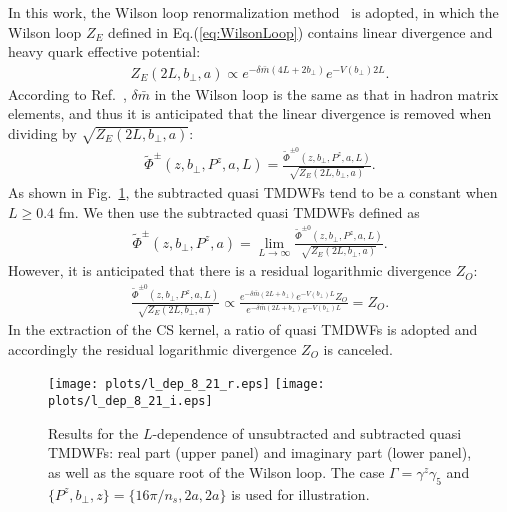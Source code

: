 \documentclass[prd,aps,twocolumn,preprintnumbers, showpacs, nofootinbib,superscriptaddress,notitlepage]{revtex4-1}
\begin{document}
In this work,  the Wilson loop renormalization method~\cite{Chen:2016fxx,Zhang:2017bzy,Musch:2010ka,Green:2017xeu,Zhang:2017zfe}  is adopted, in which the Wilson loop $Z_E$ defined in Eq.(\ref{eq:WilsonLoop})  contains linear divergence and heavy quark effective potential:
\begin{align}
Z_E\left(2L, b_{\perp}, a\right) \propto e^{-\delta \bar{m}(4L+2b_{\perp})}e^{-V(b_{\perp})2L}.
\end{align}
According to Ref.~\cite{LatticePartonCollaborationLPC:2021xdx}, $\delta \bar{m}$ in the Wilson loop is the same as that in hadron matrix elements, and thus it is anticipated that the linear divergence is removed when dividing by $\sqrt{Z_E\left(2L, b_{\perp}, a\right)}$:
\begin{align}
\tilde{\Phi}^{\pm}(z,b_{\perp},P^z,a,L)=\frac{\tilde{\Phi}^{\pm0}\left(z,b_{\perp},P^z,a,L\right)}{\sqrt{Z_E\left(2L, b_{\perp}, a\right)}}.
\end{align}
As shown in Fig.~\ref{fig:WilsonLooprenormalization}, the subtracted quasi TMDWFs tend  to  be a constant when  $L\ge 0.4$ fm. We then use the subtracted quasi TMDWFs defined as
\begin{align}\label{eq:WLRQuasi}
\tilde{\Phi}^{\pm}(z,b_{\perp},P^z, a)=\lim_{L\to\infty}\frac{\tilde{\Phi}^{\pm0}\left(z,b_{\perp},P^z,a,L\right)}{\sqrt{Z_E\left(2L, b_{\perp}, a\right)}}.
\end{align}
However, it is anticipated that there is a residual logarithmic divergence $Z_{O}$:
\begin{align}
\frac{\tilde{\Phi}^{\pm0}\left(z,b_{\perp},P^z,a,L\right)}{\sqrt{Z_E\left(2L, b_{\perp}, a\right)}}
\propto \frac{e^{-\delta \bar{m}(2L+b_{\perp})}e^{-V(b_{\perp})L}Z_{O}}{e^{-\delta \bar{m}(2L+b_{\perp})}e^{-V(b_{\perp})L}}
= Z_{O}.
\end{align}
In the extraction of the CS kernel, a ratio of quasi TMDWFs is adopted and accordingly the residual logarithmic divergence $Z_{O}$ is canceled.



\begin{figure}
\centering
\texttt{[image: plots/l\_dep\_8\_21\_r.eps]}
\texttt{[image: plots/l\_dep\_8\_21\_i.eps]}
\caption{Results for the $L$-dependence of  unsubtracted and subtracted quasi TMDWFs:  real part (upper panel) and imaginary part (lower panel), as well as the square root of the Wilson loop. The case $\Gamma=\gamma^z\gamma_5$ and $\{P^z,b_{\perp}, z\}=\{16\pi/n_s,2a,2a\}$ is used for illustration. }
\label{fig:WilsonLooprenormalization}
\end{figure}
 
\end{document}
